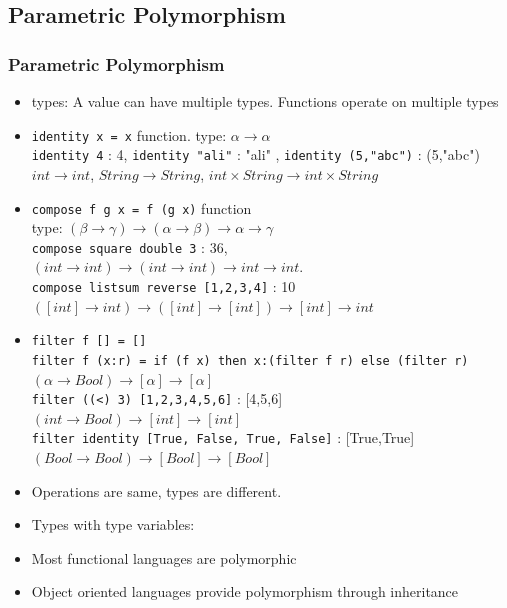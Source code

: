 \subsection{Parametric Polymorphism}
\begin{frame}
\frametitle{Parametric Polymorphism}
 \begin{itemize}[<+->]
  \item {} types: A value can have multiple types. Functions operate 
 on multiple types 
  \item \texttt{identity x = x}   function. type:	$\alpha \rightarrow \alpha$ \\
	\texttt{identity 4} : 4, \texttt{identity "ali"} : "ali" , \texttt{identity (5,"abc")} : (5,"abc") \\
	$int \rightarrow int$, $String \rightarrow String$, $int\times String \rightarrow int\times String$
 \item	\texttt{compose f g x = f (g x)} function\\
 type:  $(\beta \rightarrow \gamma) \rightarrow (\alpha \rightarrow \beta) \rightarrow \alpha \rightarrow \gamma$ \\
\texttt{compose square double 3} : 36,\\
$(int \rightarrow int) \rightarrow (int \rightarrow int) \rightarrow int \rightarrow int$.\\
\texttt{compose listsum reverse [1,2,3,4]} : 10 \\
$([int] \rightarrow int) \rightarrow ([int] \rightarrow [int]) \rightarrow [int] \rightarrow int$
 \end{itemize}
\end{frame}

\begin{frame}
 \begin{itemize}
  \item \texttt{\scriptsize filter f [] = []  \\
filter f (x:r) = if (f x) then x:(filter f r) else (filter r)}\\
 $(\alpha \rightarrow Bool) \rightarrow [\alpha] \rightarrow [\alpha]$\\
 \texttt{filter ((<) 3) [1,2,3,4,5,6]} : [4,5,6] \\
$(int \rightarrow Bool) \rightarrow [int] \rightarrow [int]$ \\
 \texttt{filter identity [True, False, True, False]} : [True,True] \\
 $(Bool \rightarrow Bool) \rightarrow [Bool] \rightarrow [Bool]$
\item Operations are same, types are different.
\item Types with type variables: 
\item Most functional languages are polymorphic
\item Object oriented languages provide polymorphism through inheritance
\end{itemize}
\end{frame}

